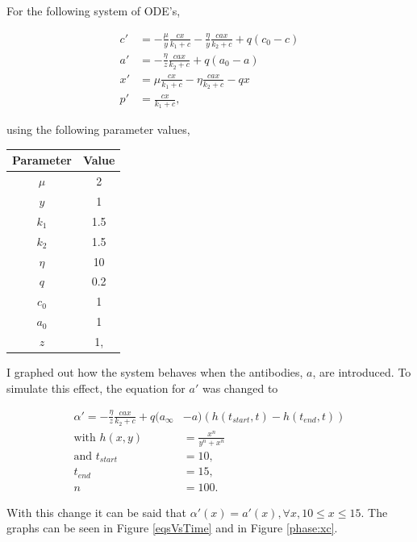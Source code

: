 \documentclass{article}
\begin{document}
For the following system of ODE's,

\begin{align} \label{sys:ODE}
  c' &= -\frac{\mu}{y} \frac{cx}{k_1 +c} - \frac{\eta}{y} \frac{cax}{k_2 +c} + q(c_0 - c) \\
  a' &= -\frac{\eta}{z} \frac{cax}{k_2+c} + q (a_0 -a)\\
  x' &= \mu \frac{cx}{k_1+c} - \eta \frac{cax}{k_2+c} - qx\\
  p' &= \frac{cx}{k_1 +c},
\end{align}

using the following parameter values,

\begin{center}
  \begin{tabular}{c|c}
    Parameter & Value \\
    \hline
    $\mu$ & 2 \\
    $y$ & 1\\
    $k_1$ & 1.5\\
    $k_2$ & 1.5\\
    $\eta$ & 10 \\
    $q$ & 0.2 \\
    $c_0$ & 1\\
    $a_0$ & 1\\
    $z$ & 1,
  \end{tabular}
\end{center}

I graphed out how the system behaves when the antibodies, $a$, are introduced. To simulate this effect, the equation for $a'$ was changed to

\begin{align}
  \alpha' = -\frac{\eta}{z} \frac{cax}{k_2+c} + q (a_\infty &-a) (h(t_{start},t) - h(t_{end},t)) \\
  \text{with } h(x,y) &= \frac{x^n}{y^n + x^n} \\
  \text{and } t_{start} &= 10, \\
  t_{end} &= 15,\\
  n &= 100. 
\end{align}

With this change it can be said that $\alpha'(x) = a'(x), \forall x, 10 \le x \le 15$. The graphs can be seen in Figure \ref{eqsVsTime} and in Figure \ref{phase:xc}.
\end{document}
